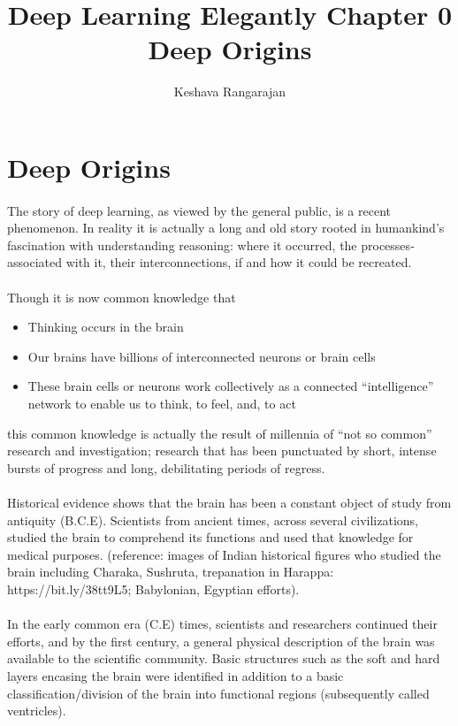 \documentclass[12pt,a4paper]{article}
\author{Keshava Rangarajan}
\title{Deep Learning Elegantly Chapter 0 Deep Origins}
\begin{document}
\section{Deep Origins}
\paragraph{}
The story of deep learning, as viewed by the general public, is a recent phenomenon. In reality it is actually a long and old story rooted in humankind’s fascination with understanding reasoning: where it occurred, the processes­­associated with it, their interconnections, if and how it could be recreated.
\paragraph{}
\noindent
Though it is now common knowledge that
\begin{itemize}
\item Thinking occurs in the brain
\item Our brains have billions of interconnected neurons or brain cells 
\item These brain cells or neurons work collectively as a connected “intelligence” network to enable us to think, to feel, and, to act
\end{itemize}
this common knowledge is actually the result of millennia of “not so common” research and investigation; research that has been punctuated by short, intense bursts of progress and long, debilitating periods of regress.

\paragraph{}
Historical evidence shows that the brain has been a constant object of study from antiquity (B.C.E). Scientists from ancient times, across several civilizations, studied the brain to comprehend its functions and used that knowledge for medical purposes.
(reference: images of Indian historical figures who studied the brain including Charaka, Sushruta, trepanation in Harappa: https://bit.ly/38tt9L5; Babylonian, Egyptian efforts). 

\paragraph{}
In the early common era (C.E) times, scientists and researchers continued their efforts, and by the first century, a general physical description of the brain was available to the scientific community.  Basic structures such as the soft and hard layers encasing the brain were identified in addition to a basic classification/division of the brain into functional regions (subsequently called ventricles). 
\end{document}
